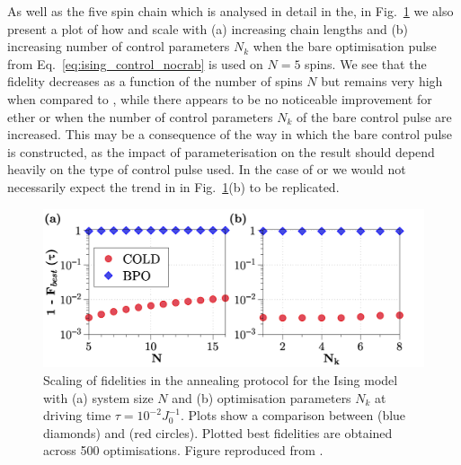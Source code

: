 As well as the five spin chain which is analysed in detail in the, in Fig.~\ref{fig:ising_scalingN} we also present a plot of how   and  scale with (a) increasing chain lengths and (b) increasing number of control parameters $N_k$ when the bare optimisation pulse from Eq.~\eqref{eq:ising_control_nocrab} is used on $N=5$ spins. We see that the  fidelity decreases as a function of the number of spins $N$ but remains very high when compared to , while there appears to be no noticeable improvement for ether  or  when the number of control parameters $N_k$ of the bare control pulse are increased. This may be a consequence of the way in which the bare control pulse is constructed, as the impact of parameterisation on the result should depend heavily on the type of control pulse used. In the case of  or  we would not necessarily expect the trend in in Fig.~\ref{fig:ising_scalingN}(b) to be replicated.

\begin{figure}[t!]
    \centering
    \includegraphics[width=\linewidth]{images/ScalingN.png} \caption[Plots of how final state fidelities scale using COLD and BPO for different system sizes and optimisable parameters.]{Scaling of fidelities in the annealing protocol for the Ising model with (a) system size $N$ and (b) optimisation parameters $N_k$ at driving time $\tau=10^{-2}J_0^{-1}$. Plots show a comparison between  (blue diamonds) and  (red circles). Plotted best fidelities are obtained across 500 optimisations. Figure reproduced from \cite{cepaite_cold_2023}.}\label{fig:ising_scalingN}
\end{figure}

